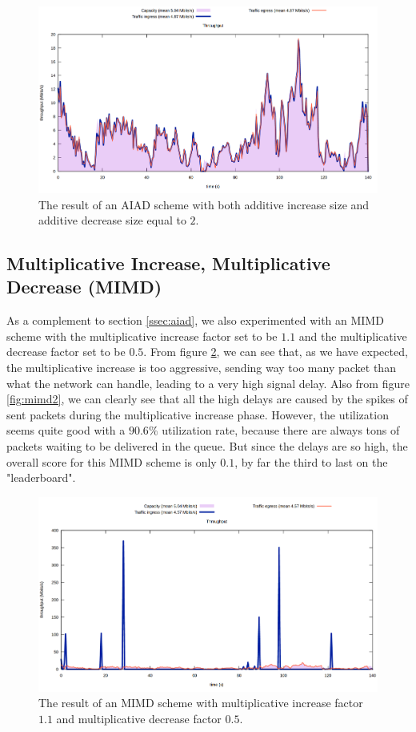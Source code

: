 \documentclass[11pt,a4paper]{article}
\begin{document}
\begin{figure}[h]
  \centering
  \includegraphics[scale=0.2]{aiad}
  \caption{The result of an AIAD scheme with both additive increase size and
  additive decrease size equal to $2$.}
  \label{fig:aiad}
\end{figure}
\subsection{Multiplicative Increase, Multiplicative Decrease (MIMD)}

As a complement to section \ref{ssec:aiad}, we also experimented with an MIMD
scheme with the multiplicative increase factor set to be $1.1$ and the
multiplicative decrease factor set to be $0.5$. From figure \ref{fig:mimd}, we
can see that, as we have expected, the multiplicative increase is too aggressive,
sending way too many packet than what the network can handle, leading to a very
high signal delay. Also from figure \ref{fig:mimd2}, we can clearly see that all
the high delays are caused by the spikes of sent packets during the
multiplicative increase phase. However, the utilization seems quite good with a $90.6\%$
utilization rate, because there are always
tons of packets waiting to be delivered in the queue. But since the delays are
so high, the overall score for this
MIMD scheme is only $0.1$, by far the third to last on the "leaderboard".

\begin{figure}[h]
  \centering
  \includegraphics[scale=0.2]{mimd}
  \caption{The result of an MIMD scheme with multiplicative increase factor
    $1.1$ and multiplicative decrease factor $0.5$.}
  \label{fig:mimd}
\end{figure}
\end{document}
